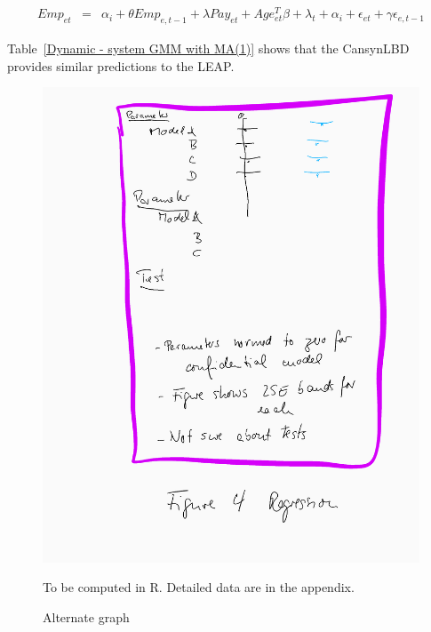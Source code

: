 \begin{eqnarray}	
Emp_{et}&=&\alpha_i +\theta Emp_{e,t-1}+\lambda Pay_{et}+Age_{et}^{T}\beta+\lambda_t+\alpha_i+\epsilon_{et}+\gamma\epsilon_{e,t-1}
\end{eqnarray}

Table~\ref{Dynamic - system GMM with MA(1)} shows that the CansynLBD provides similar predictions to the LEAP.

\begin{figure} [H]
\centering
\label{tab:all:estimates}
\includegraphics[width=.8\linewidth]{graphs/Figure4-placeholder.png} 
\caption{Alternate graph} 
\begin{minipage}{0.48\linewidth}
{\footnotesize To be computed in R. Detailed data are in the appendix. \par}
\end{minipage}
\end{figure}